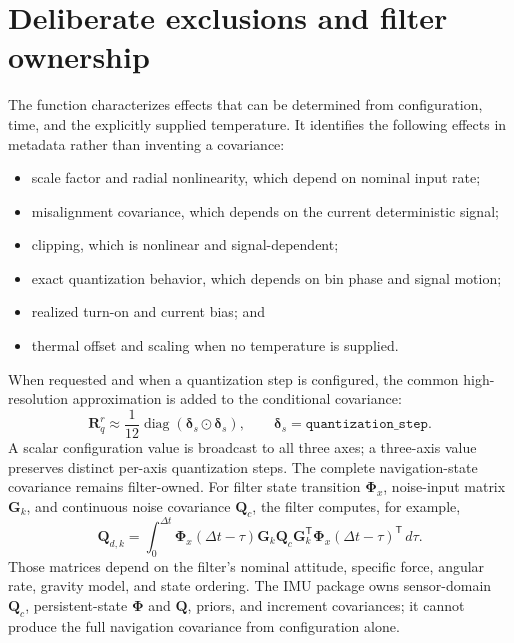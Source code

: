 \documentclass[11pt,oneside,headings=big]{scrreprt}
\newcommand{\diag}{\operatorname{diag}}
\newcommand{\Had}{\odot}
\newcommand{\vect}[1]{\bm{#1}}
\newcommand{\mat}[1]{\bm{#1}}
\newcommand{\field}[1]{\texttt{#1}}
\begin{document}
    \section{Deliberate exclusions and filter ownership}
    The function characterizes effects that can be determined from configuration,
    time, and the explicitly supplied temperature. It identifies the following
    effects in metadata rather than inventing a covariance:
    \begin{itemize}
        \item scale factor and radial nonlinearity, which depend on nominal input
        rate;
        \item misalignment covariance, which depends on the current deterministic
        signal;
        \item clipping, which is nonlinear and signal-dependent;
        \item exact quantization behavior, which depends on bin phase and signal
        motion;
        \item realized turn-on and current bias; and
        \item thermal offset and scaling when no temperature is supplied.
    \end{itemize}
    When requested and when a quantization step is configured, the common
    high-resolution approximation is added to the conditional covariance:
    \begin{equation}
        \mat R^r_q\approx\frac{1}{12}\diag\left(\vect\delta_s\Had\vect\delta_s\right),
        \qquad \vect\delta_s=\field{quantization\_step}.
        \label{eq:characterization-quantization}
    \end{equation}
    A scalar configuration value is broadcast to all three axes; a three-axis
    value preserves distinct per-axis quantization steps.
    The complete navigation-state covariance remains filter-owned. For filter state
    transition \(\mat\Phi_x\), noise-input matrix \(\mat G_k\), and continuous
    noise covariance \(\mat Q_c\), the filter computes, for example,
    \begin{equation}
        \mat Q_{d,k}=\int_0^{\Delta t}
        \mat\Phi_x(\Delta t-\tau)\mat G_k\mat Q_c\mat G_k^{\mathsf T}
        \mat\Phi_x(\Delta t-\tau)^{\mathsf T}\,d\tau.
    \end{equation}
    Those matrices depend on the filter's nominal attitude, specific force, angular
    rate, gravity model, and state ordering. The IMU package owns sensor-domain
    \(\mat Q_c\), persistent-state \(\mat\Phi\) and \(\mat Q\), priors, and
    increment covariances; it cannot produce the full navigation covariance from
    configuration alone.
\end{document}

